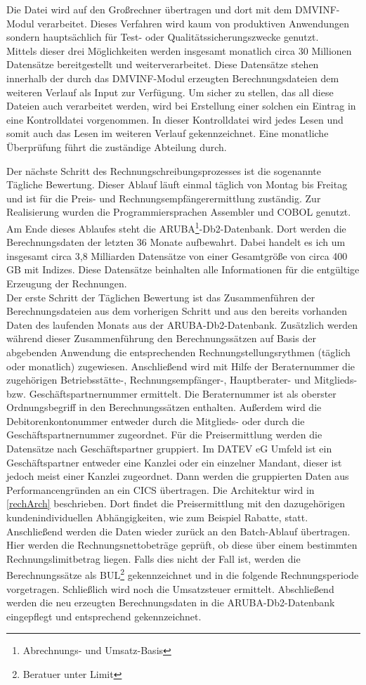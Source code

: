 Die Datei wird auf den Großrechner übertragen und dort mit dem DMVINF-Modul verarbeitet.
Dieses Verfahren wird kaum von produktiven Anwendungen sondern hauptsächlich für Test- oder Qualitätssicherungszwecke genutzt.\\
Mittels dieser drei Möglichkeiten werden insgesamt monatlich circa 30 Millionen Datensätze bereitgestellt und weiterverarbeitet.
Diese Datensätze stehen innerhalb der durch das DMVINF-Modul erzeugten Berechnungsdateien dem weiteren Verlauf als Input zur Verfügung.
Um sicher zu stellen, das all diese Dateien auch verarbeitet werden, wird bei Erstellung einer solchen ein Eintrag in eine Kontrolldatei vorgenommen.
In dieser Kontrolldatei wird jedes Lesen und somit auch das Lesen im weiteren Verlauf gekennzeichnet.
Eine monatliche Überprüfung führt die zuständige Abteilung durch.

Der nächste Schritt des Rechnungschreibungsprozesses ist die sogenannte Tägliche Bewertung.
Dieser Ablauf läuft einmal täglich von Montag bis Freitag und ist für die Preis- und Rechnungsempfängerermittlung zuständig.
Zur Realisierung wurden die Programmiersprachen Assembler und COBOL genutzt.
Am Ende dieses Ablaufes steht die ARUBA\footnote{Abrechnungs- und Umsatz-Basis}-Db2-Datenbank.
Dort werden die Berechnungsdaten der letzten 36 Monate aufbewahrt.
Dabei handelt es ich um insgesamt circa 3,8 Milliarden Datensätze von einer Gesamtgröße von circa 400 GB mit Indizes.
Diese Datensätze beinhalten alle Informationen für die entgültige Erzeugung der Rechnungen.\\
Der erste Schritt der Täglichen Bewertung ist das Zusammenführen der Berechnungsdateien aus dem vorherigen Schritt und aus den bereits vorhanden Daten des laufenden Monats aus der ARUBA-Db2-Datenbank.
Zusätzlich werden während dieser Zusammenführung den Berechnungssätzen auf Basis der abgebenden Anwendung die entsprechenden Rechnungstellungsrythmen (täglich oder monatlich) zugewiesen.
Anschließend wird mit Hilfe der Beraternummer die zugehörigen Betriebsstätte-, Rechnungsempfänger-, Hauptberater- und Mitglieds- bzw. Geschäftspartnernummer ermittelt.
Die Beraternummer ist als oberster Ordnungsbegriff in den Berechnungssätzen enthalten.
Außerdem wird die Debitorenkontonummer entweder durch die Mitglieds- oder durch die Geschäftspartnernummer zugeordnet.
Für die Preisermittlung werden die Datensätze nach Geschäftspartner gruppiert.
Im DATEV eG Umfeld ist ein Geschäftspartner entweder eine Kanzlei oder ein einzelner Mandant, dieser ist jedoch meist einer Kanzlei zugeordnet.
Dann werden die gruppierten Daten aus Performancengründen an ein CICS übertragen.
Die Architektur wird in \ref{rechArch} beschrieben.
Dort findet die Preisermittlung mit den dazugehörigen kundenindividuellen Abhängigkeiten, wie zum Beispiel Rabatte, statt.
Anschließend werden die Daten wieder zurück an den Batch-Ablauf übertragen.
Hier werden die Rechnungsnettobeträge geprüft, ob diese über einem bestimmten Rechnungslimitbetrag liegen.
Falls dies nicht der Fall ist, werden die Berechnungssätze als BUL\footnote{Beratuer unter Limit} gekennzeichnet und in die folgende Rechnungsperiode vorgetragen.
Schließlich wird noch die Umsatzsteuer ermittelt.
Abschließend werden die neu erzeugten Berechnungsdaten in die ARUBA-Db2-Datenbank eingepflegt und entsprechend gekennzeichnet.

